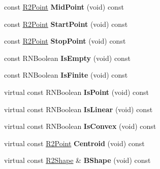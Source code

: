 \begin{DoxyCompactItemize}
\item 
const \hyperlink{class_r2_point}{R2\+Point} {\bfseries Mid\+Point} (void) const \hypertarget{class_r2_arc_ab12a76c4beab47fd53d1dd6367b26fed}{}\label{class_r2_arc_ab12a76c4beab47fd53d1dd6367b26fed}

\item 
const \hyperlink{class_r2_point}{R2\+Point} {\bfseries Start\+Point} (void) const \hypertarget{class_r2_arc_aad9f4b2a7e11ce3f7726cb7f18699978}{}\label{class_r2_arc_aad9f4b2a7e11ce3f7726cb7f18699978}

\item 
const \hyperlink{class_r2_point}{R2\+Point} {\bfseries Stop\+Point} (void) const \hypertarget{class_r2_arc_aab29f137c725113f256e92b4941488f9}{}\label{class_r2_arc_aab29f137c725113f256e92b4941488f9}

\item 
const R\+N\+Boolean {\bfseries Is\+Empty} (void) const \hypertarget{class_r2_arc_a3da24ee22d9e7a6129c42d1427d6cba0}{}\label{class_r2_arc_a3da24ee22d9e7a6129c42d1427d6cba0}

\item 
const R\+N\+Boolean {\bfseries Is\+Finite} (void) const \hypertarget{class_r2_arc_a37c4dea73b42146f5fdf4f85db5bc07b}{}\label{class_r2_arc_a37c4dea73b42146f5fdf4f85db5bc07b}

\item 
virtual const R\+N\+Boolean {\bfseries Is\+Point} (void) const \hypertarget{class_r2_arc_ad8d6a4add1021a21aa60b9f6d38108d5}{}\label{class_r2_arc_ad8d6a4add1021a21aa60b9f6d38108d5}

\item 
virtual const R\+N\+Boolean {\bfseries Is\+Linear} (void) const \hypertarget{class_r2_arc_a45b4b16e4a81d96a545bff759a7e0201}{}\label{class_r2_arc_a45b4b16e4a81d96a545bff759a7e0201}

\item 
virtual const R\+N\+Boolean {\bfseries Is\+Convex} (void) const \hypertarget{class_r2_arc_afede8d69b10718c2705d83d91047e951}{}\label{class_r2_arc_afede8d69b10718c2705d83d91047e951}

\item 
virtual const \hyperlink{class_r2_point}{R2\+Point} {\bfseries Centroid} (void) const \hypertarget{class_r2_arc_aa6e707f840f9fe64a2efc18a2736f8c8}{}\label{class_r2_arc_aa6e707f840f9fe64a2efc18a2736f8c8}

\item 
virtual const \hyperlink{class_r2_shape}{R2\+Shape} \& {\bfseries B\+Shape} (void) const \hypertarget{class_r2_arc_abe97b60bd09de5a35e1ce5f49f4a7d6f}{}\label{class_r2_arc_abe97b60bd09de5a35e1ce5f49f4a7d6f}


\end{DoxyCompactItemize}
